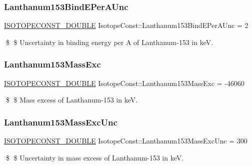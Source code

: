 \subsubsection{\texorpdfstring{Lanthanum153\+Bind\+E\+Per\+A\+Unc}{Lanthanum153BindEPerAUnc}}
{\footnotesize\ttfamily \mbox{\hyperlink{group___isotope_const-_macros_ga8f45a7272ce02c0b4c65c44636ed719a}{I\+S\+O\+T\+O\+P\+E\+C\+O\+N\+S\+T\+\_\+\+D\+O\+U\+B\+LE}} Isotope\+Const\+::\+Lanthanum153\+Bind\+E\+Per\+A\+Unc = 2}

\$ \$ Uncertainty in binding energy per A of Lanthanum-\/153 in keV. \mbox{\label{group___isotope_const-_lanthanum-_la153_ga83cef69375a32ed8bd98ab2418df8961}} 
\subsubsection{\texorpdfstring{Lanthanum153\+Mass\+Exc}{Lanthanum153MassExc}}
{\footnotesize\ttfamily \mbox{\hyperlink{group___isotope_const-_macros_ga8f45a7272ce02c0b4c65c44636ed719a}{I\+S\+O\+T\+O\+P\+E\+C\+O\+N\+S\+T\+\_\+\+D\+O\+U\+B\+LE}} Isotope\+Const\+::\+Lanthanum153\+Mass\+Exc = -\/46060}

\$ \$ Mass excess of Lanthanum-\/153 in keV. \mbox{\label{group___isotope_const-_lanthanum-_la153_gaf4064cc41c4a4f6d408d9311ca86fb24}} 
\subsubsection{\texorpdfstring{Lanthanum153\+Mass\+Exc\+Unc}{Lanthanum153MassExcUnc}}
{\footnotesize\ttfamily \mbox{\hyperlink{group___isotope_const-_macros_ga8f45a7272ce02c0b4c65c44636ed719a}{I\+S\+O\+T\+O\+P\+E\+C\+O\+N\+S\+T\+\_\+\+D\+O\+U\+B\+LE}} Isotope\+Const\+::\+Lanthanum153\+Mass\+Exc\+Unc = 300}

\$ \$ Uncertainty in mass excess of Lanthanum-\/153 in keV. \mbox{\label{group___isotope_const-_lanthanum-_la153_gad865c636126d60aca010e18b5f778f26}} 
